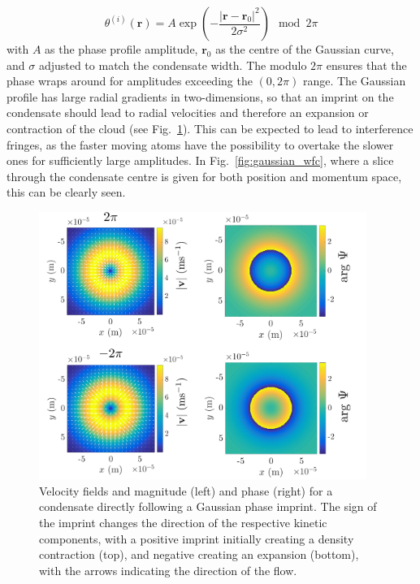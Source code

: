 \begin{equation}
    \theta^{(i)}(\mathbf{r}) = A\exp\left( -\frac{ |\mathbf{r}-\mathbf{r}_0|^2 }{2\sigma^2 } \right) \mod 2\pi
\end{equation}
with $A$ as the phase profile amplitude, $\mathbf{r}_0$ as the centre of the Gaussian curve, and $\sigma$ adjusted to match the condensate width. The modulo $2\pi$ ensures that the phase wraps around for amplitudes exceeding the $(0,2\pi)$ range. The Gaussian profile has large radial gradients in two-dimensions, so that an imprint on the condensate should lead to radial velocities and therefore an expansion or contraction of the cloud (see Fig.~\ref{fig:gaussian}). This can be expected to lead to interference fringes, as the faster moving atoms have the possibility to overtake the slower ones for sufficiently large amplitudes. In Fig.~\ref{fig:gaussian_wfc}, where a slice through the condensate centre is given for both position and momentum space, this can be clearly seen. %

\begin{figure}\centering
    \includegraphics[width=0.95\textwidth]{Images/ch4_vtx/velocity/gaussian_imprint}
    \caption{Velocity fields and magnitude (left) and phase (right) for a condensate directly following a Gaussian phase imprint. The sign of the imprint changes the direction of the respective kinetic components, with a positive imprint initially creating a density contraction (top), and negative creating an expansion (bottom), with the arrows indicating the direction of the flow.}\label{fig:gaussian}
\end{figure}


